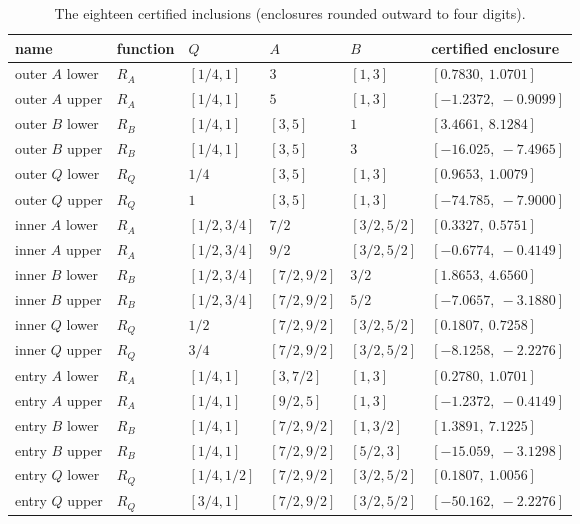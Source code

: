 \documentclass[11pt,a4paper]{article}
\theoremstyle{plain}
\theoremstyle{definition}
\theoremstyle{remark}
\begin{document}
\begin{table}[htb]
\centering\small\renewcommand{\arraystretch}{1.15}
\caption{The eighteen certified inclusions (enclosures rounded outward to four digits).}
\label{tab:certificate}
\begin{tabular}{llllll}
\toprule
name & function & $Q$ & $A$ & $B$ & certified enclosure\\
\midrule
outer $A$ lower & $R_A$ & $[1/4,1]$ & $3$ & $[1,3]$ & $[0.7830,\ 1.0701]$\\
outer $A$ upper & $R_A$ & $[1/4,1]$ & $5$ & $[1,3]$ & $[-1.2372,\ -0.9099]$\\
outer $B$ lower & $R_B$ & $[1/4,1]$ & $[3,5]$ & $1$ & $[3.4661,\ 8.1284]$\\
outer $B$ upper & $R_B$ & $[1/4,1]$ & $[3,5]$ & $3$ & $[-16.025,\ -7.4965]$\\
outer $Q$ lower & $R_Q$ & $1/4$ & $[3,5]$ & $[1,3]$ & $[0.9653,\ 1.0079]$\\
outer $Q$ upper & $R_Q$ & $1$ & $[3,5]$ & $[1,3]$ & $[-74.785,\ -7.9000]$\\
inner $A$ lower & $R_A$ & $[1/2,3/4]$ & $7/2$ & $[3/2,5/2]$ & $[0.3327,\ 0.5751]$\\
inner $A$ upper & $R_A$ & $[1/2,3/4]$ & $9/2$ & $[3/2,5/2]$ & $[-0.6774,\ -0.4149]$\\
inner $B$ lower & $R_B$ & $[1/2,3/4]$ & $[7/2,9/2]$ & $3/2$ & $[1.8653,\ 4.6560]$\\
inner $B$ upper & $R_B$ & $[1/2,3/4]$ & $[7/2,9/2]$ & $5/2$ & $[-7.0657,\ -3.1880]$\\
inner $Q$ lower & $R_Q$ & $1/2$ & $[7/2,9/2]$ & $[3/2,5/2]$ & $[0.1807,\ 0.7258]$\\
inner $Q$ upper & $R_Q$ & $3/4$ & $[7/2,9/2]$ & $[3/2,5/2]$ & $[-8.1258,\ -2.2276]$\\
entry $A$ lower & $R_A$ & $[1/4,1]$ & $[3,7/2]$ & $[1,3]$ & $[0.2780,\ 1.0701]$\\
entry $A$ upper & $R_A$ & $[1/4,1]$ & $[9/2,5]$ & $[1,3]$ & $[-1.2372,\ -0.4149]$\\
entry $B$ lower & $R_B$ & $[1/4,1]$ & $[7/2,9/2]$ & $[1,3/2]$ & $[1.3891,\ 7.1225]$\\
entry $B$ upper & $R_B$ & $[1/4,1]$ & $[7/2,9/2]$ & $[5/2,3]$ & $[-15.059,\ -3.1298]$\\
entry $Q$ lower & $R_Q$ & $[1/4,1/2]$ & $[7/2,9/2]$ & $[3/2,5/2]$ & $[0.1807,\ 1.0056]$\\
entry $Q$ upper & $R_Q$ & $[3/4,1]$ & $[7/2,9/2]$ & $[3/2,5/2]$ & $[-50.162,\ -2.2276]$\\
\bottomrule
\end{tabular}
\end{table}



\end{document}
